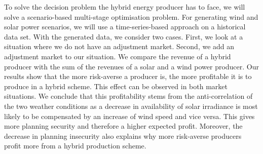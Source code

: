 To solve the  decision problem the hybrid energy producer has to face, we will solve a scenario-based multi-stage optimisation problem. For generating wind and solar power scenarios, we will use a time-series-based approach on a historical data set. With the generated data, we consider two cases. First, we look at a situation where we do not have an adjustment market. Second, we add an adjustment market to our situation. We compare the revenue of a hybrid producer with the sum of the revenues of a solar and a wind power producer. Our results show that the more risk-averse a producer is, the more profitable it is to produce in a hybrid scheme. This effect can be observed in both market situations. We conclude that this profitability stems from the anti-correlation of the two weather conditions as a decrease in availability of solar irradiance is most likely to be compensated by an increase of wind speed and vice versa. This gives more planning security and therefore a higher expected profit. Moreover, the decrease in planning insecurity also explains why more risk-averse producers profit more from a hybrid production scheme.  
